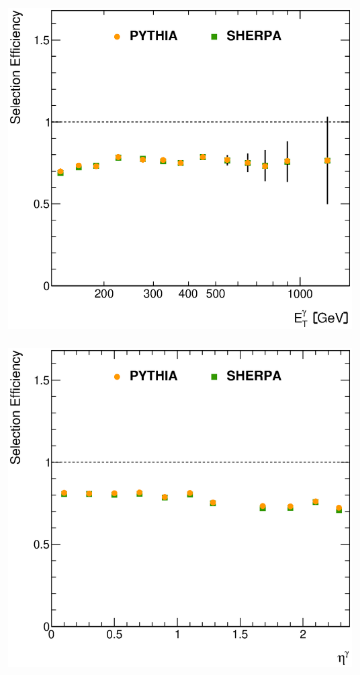 \documentclass[12pt, twoside]{article}
\numberwithin{equation}{section}
\numberwithin{figure}{section}
\newenvironment{changemargin}[2]{%
\begin{list}{}{%
\setlength{\topsep}{0pt}%
\setlength{\leftmargin}{#1}%
\setlength{\rightmargin}{#2}%
\setlength{\listparindent}{\parindent}%
\setlength{\itemindent}{\parindent}%
\setlength{\parsep}{\parskip}%
}%
\item[]}{\end{list}}
\begin{document}
\begin{figure}
    \centering
    \checkoddpage
    \ifoddpage
        \begin{changemargin}{-1.0cm}{-0.75cm}
    \else
        \begin{changemargin}{-0.75cm}{-1.0cm}
    \fi
        \begin{subfigure}[b]{0.37\textwidth}
            \includegraphics[width=\textwidth]{./images/SelectionEfficiencies/EFF-101.eps}
            \subcaption{}
            \label{fig:SelectionEfficienciesEtPhoton}
        \end{subfigure}
        \begin{subfigure}[b]{0.37\textwidth}
            \includegraphics[width=\textwidth]{./images/SelectionEfficiencies/EFF-102.eps}

\end{subfigure}
\end{changemargin}
\end{changemargin}
\end{figure}
\end{document}
